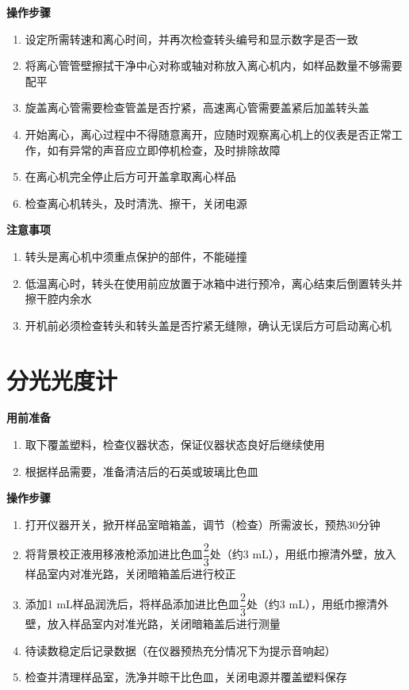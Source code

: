 \documentclass[
]{book}
\providecommand{\tightlist}{%
  \setlength{\itemsep}{0pt}\setlength{\parskip}{0pt}}
\begin{document}
\textbf{操作步骤}

\begin{enumerate}
\def\labelenumi{\arabic{enumi}.}
\tightlist
\item
  设定所需转速和离心时间，并再次检查转头编号和显示数字是否一致
\item
  将离心管管壁擦拭干净中心对称或轴对称放入离心机内，如样品数量不够需要配平
\item
  旋盖离心管需要检查管盖是否拧紧，高速离心管需要盖紧后加盖转头盖
\item
  开始离心，离心过程中不得随意离开，应随时观察离心机上的仪表是否正常工作，如有异常的声音应立即停机检查，及时排除故障
\item
  在离心机完全停止后方可开盖拿取离心样品
\item
  检查离心机转头，及时清洗、擦干，关闭电源
\end{enumerate}

\textbf{注意事项}

\begin{enumerate}
\def\labelenumi{\arabic{enumi}.}
\tightlist
\item
  转头是离心机中须重点保护的部件，不能碰撞
\item
  低温离心时，转头在使用前应放置于冰箱中进行预冷，离心结束后倒置转头并擦干腔内余水
\item
  开机前必须检查转头和转头盖是否拧紧无缝隙，确认无误后方可启动离心机
\end{enumerate}

\hypertarget{ux5206ux5149ux5149ux5ea6ux8ba1}{%
\section{分光光度计}\label{ux5206ux5149ux5149ux5ea6ux8ba1}}

\textbf{用前准备}

\begin{enumerate}
\def\labelenumi{\arabic{enumi}.}
\tightlist
\item
  取下覆盖塑料，检查仪器状态，保证仪器状态良好后继续使用
\item
  根据样品需要，准备清洁后的石英或玻璃比色皿
\end{enumerate}

\textbf{操作步骤}

\begin{enumerate}
\def\labelenumi{\arabic{enumi}.}
\tightlist
\item
  打开仪器开关，掀开样品室暗箱盖，调节（检查）所需波长，预热30分钟
\item
  将背景校正液用移液枪添加进比色皿\(\dfrac{2}{3}\)处（约3 mL），用纸巾擦清外壁，放入样品室内对准光路，关闭暗箱盖后进行校正
\item
  添加1 mL样品润洗后，将样品添加进比色皿\(\dfrac{2}{3}\)处（约3 mL），用纸巾擦清外壁，放入样品室内对准光路，关闭暗箱盖后进行测量
\item
  待读数稳定后记录数据（在仪器预热充分情况下为提示音响起）
\item
  检查并清理样品室，洗净并晾干比色皿，关闭电源并覆盖塑料保存
\end{enumerate}
\end{document}
